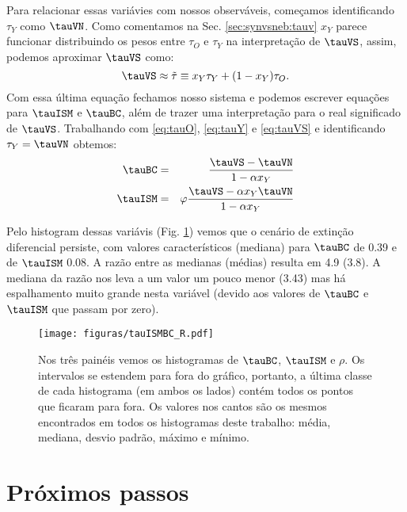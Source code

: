 Para relacionar essas variávies com nossos observáveis, começamos identificando $\tau_Y$ como
$\tauVN$. Como comentamos na Sec. \ref{sec:synvsneb:tauv} $x_Y$ parece funcionar distribuindo os
pesos entre $\tau_O$ e $\tau_Y$ na interpretação de $\tauVS$, assim, podemos aproximar $\tauVS$
como:
\begin{equation}
	\tauVS \approx \tilde{\tau} \equiv x_Y \tau_Y + (1 - x_Y) \tau_O.
	\label{eq:tauVS}
\end{equation}
Com essa última equação fechamos nosso sistema e podemos escrever equações para $\tauISM$ e
$\tauBC$, além de trazer uma interpretação para o real significado de $\tauVS$. Trabalhando com
\eqref{eq:tauO}, \eqref{eq:tauY} e \eqref{eq:tauVS} e identificando $\tau_Y = \tauVN$ obtemos:
\begin{eqnarray}
	\tauBC &=& \frac{\tauVS - \tauVN}{1 - \alpha x_Y} \\
	\label{eq:tauBC}
	\tauISM &=& \varphi\frac{\tauVS - \alpha x_Y \tauVN}{1 - \alpha x_Y}  
	\label{eq:tauISM}
\end{eqnarray}

Pelo histogram dessas variávis (Fig. \ref{fig:tauBCISM}) vemos que o cenário de extinção diferencial
persiste, com valores característicos (mediana) para $\tauBC$ de 0.39 e de $\tauISM$ 0.08. A razão
entre as medianas (médias) resulta em 4.9 (3.8). A mediana da razão nos leva a um valor um pouco
menor (3.43) mas há espalhamento muito grande nesta variável (devido aos valores de $\tauBC$ e
$\tauISM$ que passam por zero). 

\begin{figure}
	\centering
	\texttt{[image: figuras/tauISMBC\_R.pdf]}
	\caption[Histogramas de $\tauBC$, $\tauISM$ e $\rho$]
	{Nos três painéis vemos os histogramas de $\tauBC$, $\tauISM$ e $\rho$. Os intervalos se estendem
para fora do gráfico, portanto, a última classe de cada histograma (em ambos os lados) contém todos
os pontos que ficaram para fora. Os valores nos cantos são os mesmos encontrados em todos os
histogramas deste trabalho: média, mediana, desvio padrão, máximo e mínimo.}
	\label{fig:tauBCISM}
\end{figure}

\section{Próximos passos}
\label{sec:difextin:nextsteps}


